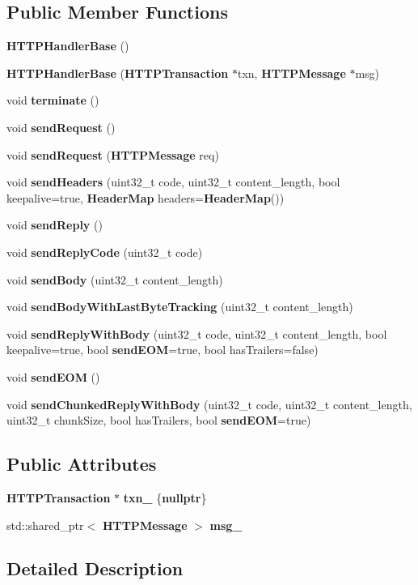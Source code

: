 \subsection*{Public Member Functions}
\begin{DoxyCompactItemize}
\item 
{\bf H\+T\+T\+P\+Handler\+Base} ()
\item 
{\bf H\+T\+T\+P\+Handler\+Base} ({\bf H\+T\+T\+P\+Transaction} $\ast$txn, {\bf H\+T\+T\+P\+Message} $\ast$msg)
\item 
void {\bf terminate} ()
\item 
void {\bf send\+Request} ()
\item 
void {\bf send\+Request} ({\bf H\+T\+T\+P\+Message} req)
\item 
void {\bf send\+Headers} (uint32\+\_\+t code, uint32\+\_\+t content\+\_\+length, bool keepalive=true, {\bf Header\+Map} headers={\bf Header\+Map}())
\item 
void {\bf send\+Reply} ()
\item 
void {\bf send\+Reply\+Code} (uint32\+\_\+t code)
\item 
void {\bf send\+Body} (uint32\+\_\+t content\+\_\+length)
\item 
void {\bf send\+Body\+With\+Last\+Byte\+Tracking} (uint32\+\_\+t content\+\_\+length)
\item 
void {\bf send\+Reply\+With\+Body} (uint32\+\_\+t code, uint32\+\_\+t content\+\_\+length, bool keepalive=true, bool {\bf send\+E\+OM}=true, bool has\+Trailers=false)
\item 
void {\bf send\+E\+OM} ()
\item 
void {\bf send\+Chunked\+Reply\+With\+Body} (uint32\+\_\+t code, uint32\+\_\+t content\+\_\+length, uint32\+\_\+t chunk\+Size, bool has\+Trailers, bool {\bf send\+E\+OM}=true)
\end{DoxyCompactItemize}
\subsection*{Public Attributes}
\begin{DoxyCompactItemize}
\item 
{\bf H\+T\+T\+P\+Transaction} $\ast$ {\bf txn\+\_\+} \{{\bf nullptr}\}
\item 
std\+::shared\+\_\+ptr$<$ {\bf H\+T\+T\+P\+Message} $>$ {\bf msg\+\_\+}
\end{DoxyCompactItemize}


\subsection{Detailed Description}


